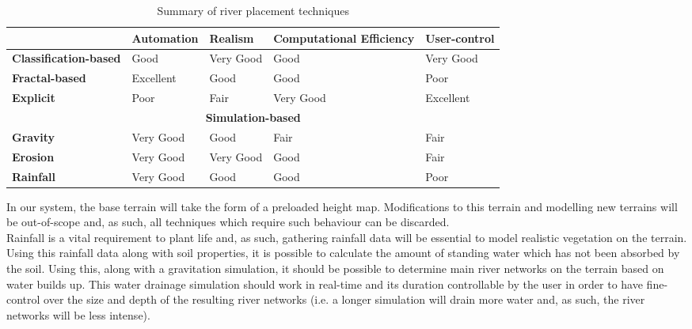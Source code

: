 \begin{table}[h]
  \centering
	    \begin{tabular}{|p{4cm}|p{3cm}|p{3cm}|p{3cm}|p{3cm}|}
  	    \hline	
  	      & \textbf{Automation} & \textbf{Realism} & \textbf{Computational Efficiency} & \textbf{User-control} \\
		\hline	
		\textbf{Classification-based} & 
		 Good  & Very Good  & Good & Very Good  \\
  	    \hline	
		\textbf{Fractal-based} & 
		 Excellent & Good & Good & Poor  \\
  	    \hline
		\textbf{Explicit} & 
		 Poor & Fair & Very Good & Excellent   \\
  	    \hline
  	    \multicolumn{5}{|c|}{\textbf{Simulation-based}} \\
  	    \hline				
  	    \textbf{Gravity} & 
		 Very Good & Good & Fair & Fair   \\
  	    \hline
		\textbf{Erosion} & 
		 Very Good & Very Good & Good & Fair      \\
  	    \hline
  	    	\textbf{Rainfall} & 
		 Very Good & Good & Good & Poor      \\
  	    \hline		
  	    \end{tabular}
  \caption[Summary of river placement techniques]{Summary of river placement techniques}
	\label{Pros and cons of individual techniques}
\end{table}

In our system, the base terrain will take the form of a preloaded height map. Modifications to this terrain and modelling new terrains will be out-of-scope and, as such, all techniques which require such behaviour can be discarded.\\
Rainfall is a vital requirement to plant life and, as such, gathering rainfall data will be essential to model realistic vegetation on the terrain. Using this rainfall data along with soil properties, it is possible to calculate the amount of standing water which has not been absorbed by the soil. Using this, along with a gravitation simulation, it should be possible to determine main river networks on the terrain based on water builds up. This water drainage simulation should work in real-time and its duration controllable by the user in order to have fine-control over the size and depth of the resulting river networks (i.e. a longer simulation will drain more water and, as such, the river networks will be less intense).
